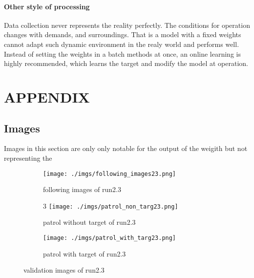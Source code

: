 \documentclass[paper=a4, fontsize=11pt]{scrartcl} %
\numberwithin{equation}{section} %
\numberwithin{figure}{section} %
\numberwithin{table}{section} %
\begin{document}
\begin{enumerate}
\begin{itemize}
{\paragraph{Other style of processing}
Data collection never represents the reality perfectly. The conditions for operation changes with demands, and surroundings. That is a model with a fixed weights cannot adapt such dynamic environment in the realy world and performs well. Instead of setting the weights in a batch methods at once, an online learning is highly recommended, which learns the target and modify the model at operation.
\newpage
\section{APPENDIX}\label{appendix}

\subsection{Images}
Images in this section are only only notable for the output of the weigith but not representing the 

\begin{figure}[ht]
	\begin{subfigure}{0.33\textwidth}
	\texttt{[image: ./imgs/following\_images23.png]} 
	\caption{following images of run2.3}
	\label{fig:subfollowing_images23}
	\end{subfigure}
	\begin{subfigure}{0.33\textwidth}3
	\texttt{[image: ./imgs/patrol\_non\_targ23.png]}
	\caption{patrol without target of run2.3}
	\label{fig:subpatrol_non_targ23}
	\end{subfigure}
	\begin{subfigure}{0.33\textwidth}
	\texttt{[image: ./imgs/patrol\_with\_targ23.png]}
	\caption{patrol with target of run2.3}
	\label{fig:subpatrol_with_targ23}
	\end{subfigure}

	\caption{validation images of run2.3}
	\label{fig:outputimages23}
\end{figure}

}
\end{itemize}
\end{enumerate}
\end{document}

